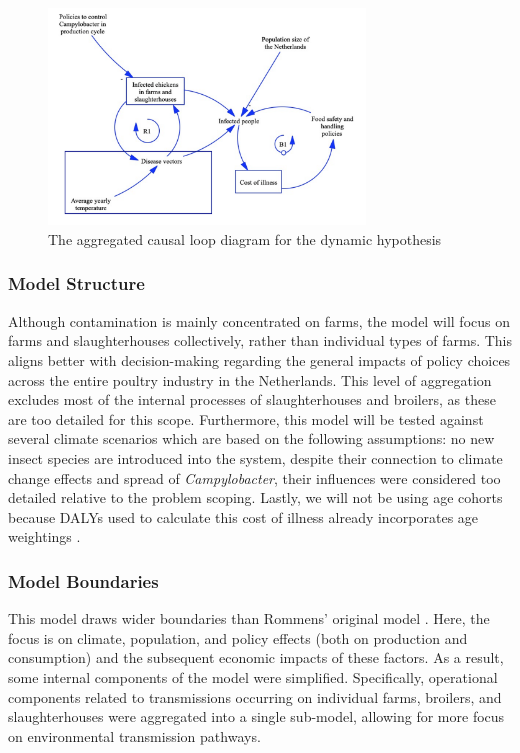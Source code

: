 \begin{figure}[h]
\centering
\includegraphics[width=0.75\textwidth]{images/dynamic_hypo2.png}
\caption{The aggregated causal loop diagram for the dynamic hypothesis}
\label{fig:aggregrated_cld}
\end{figure}
 
\subsubsection*{Model Structure}
Although contamination is mainly concentrated on farms, the model will focus on farms and slaughterhouses collectively, rather than individual types of farms. This aligns better with decision-making regarding the general impacts of policy choices across the entire poultry industry in the Netherlands. This level of aggregation excludes most of the internal processes of slaughterhouses and broilers, as these are too detailed for this scope. Furthermore, this model will be tested against several climate scenarios which are based on the following assumptions: no new insect species are introduced into the system, despite their connection to climate change effects and spread of \textit{Campylobacter}, their influences were considered too detailed relative to the problem scoping. Lastly, we will not be using age cohorts because DALYs used to calculate this cost of illness already incorporates age weightings \parencite{mangen_campylobacteriosis_2007}. 
\subsubsection*{Model Boundaries}

This model draws wider boundaries than Rommens' original model \parencite{rommens_infected_2020}. Here, the focus is on climate, population, and policy effects (both on production and consumption) and the subsequent economic impacts of these factors. As a result, some internal components of the model were simplified. Specifically, operational components related to transmissions occurring on individual farms, broilers, and slaughterhouses were aggregated into a single sub-model, allowing for more focus on environmental transmission pathways.

